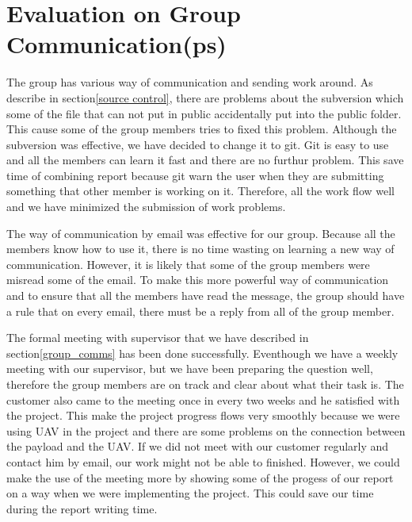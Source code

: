 \section{Evaluation on Group Communication(ps)}
\label{evaluation on group communication}

The group has various way of communication and sending work around.
As describe in section\ref{source control}, there are problems about the subversion which some of the file that can not put in public accidentally put into the public folder.
This cause some of the group members tries to fixed this problem.
Although the subversion was effective, we have decided to change it to git.
Git is easy to use and all the members can learn it fast and there are no furthur problem.
This save time of combining report because git warn the user when they are submitting something that other member is working on it.
Therefore, all the work flow well and we have minimized the submission of work problems.

The way of communication by email was effective for our group.
Because all the members know how to use it, there is no time wasting on learning a new way of communication.
However, it is likely that some of the group members were misread some of the email.
To make this more powerful way of communication and to ensure that all the members have read the message, the group should have a rule that on every email, there must be a reply from all of the group member.

The formal meeting with supervisor that we have described in section\ref{group_comms} has been done successfully. 
Eventhough we have a weekly meeting with our supervisor, but we have been preparing the question well, therefore the group members are on track and clear about what their task is.
The customer also came to the meeting once in every two weeks and he satisfied with the project.
This make the project progress flows very smoothly because we were using UAV in the project and there are some problems on the connection between the payload and the UAV.
If we did not meet with our customer regularly and contact him by email, our work might not be able to finished.
However, we could make the use of the meeting more by showing some of the progess of our report on a way when we were implementing the project.
This could save our time during the report writing time.

